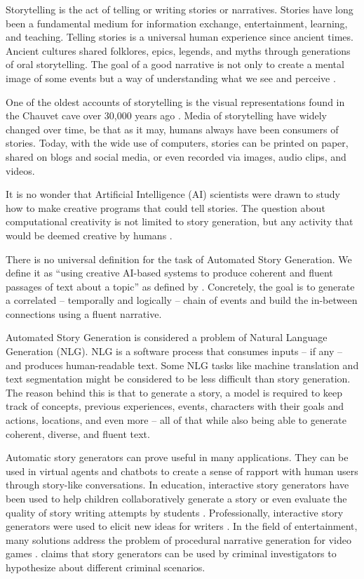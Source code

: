 Storytelling is the act of telling or writing stories or narratives. Stories have long been a fundamental medium for information exchange, entertainment, learning, and teaching. Telling stories is a universal human experience since ancient times. Ancient cultures shared folklores, epics, legends, and myths through generations of oral storytelling. The goal of a good narrative is not only to create a mental image of some events but a way of understanding what we see and perceive \citep{welsch1998history}.

One of the oldest accounts of storytelling is the visual representations found in the Chauvet cave over 30,000 years ago \citep{clottes2003chauvet}. Media of storytelling have widely changed over time, be that as it may, humans always have been consumers of stories. Today, with the wide use of computers, stories can be printed on paper, shared on blogs and social media, or even recorded via images, audio clips, and videos.

It is no wonder that Artificial Intelligence (AI) scientists were drawn to study how to make creative programs that could tell stories. The question about computational creativity is not limited to story generation, but any activity that would be deemed creative by humans \citep{colton2009computational}.

There is no universal definition for the task of Automated Story Generation. We define it as ``using creative AI-based systems to produce coherent and fluent passages of text about a topic'' as defined by \citep{fan2018hierarchical}. Concretely, the goal is to generate a correlated -- temporally and logically -- chain of events and build the in-between connections using a fluent narrative.

Automated Story Generation is considered a problem of Natural Language Generation (NLG). NLG is a software process that consumes inputs -- if any -- and produces human-readable text. Some NLG tasks like machine translation and text segmentation might be considered to be less difficult than story generation. The reason behind this is that to generate a story, a model is required to keep track of concepts, previous experiences, events, characters with their goals and actions, locations, and even more -- all of that while also being able to generate coherent, diverse, and fluent text.

Automatic story generators can prove useful in many applications. They can be used in virtual agents and chatbots to create a sense of rapport with human users through story-like conversations. In education, interactive story generators have been used to help children collaboratively generate a story \citep{robertson2003using} or even evaluate the quality of story writing attempts by students \citep{halpin2004towards}. Professionally, interactive story generators were used to elicit new ideas for writers \citep{clark2018creative}. In the field of entertainment, many solutions address the problem of procedural narrative generation for video games \citep{griffith2018procedural}. \citep{martin2021neurosymbolic} claims that story generators can be used by criminal investigators to hypothesize about different criminal scenarios.

